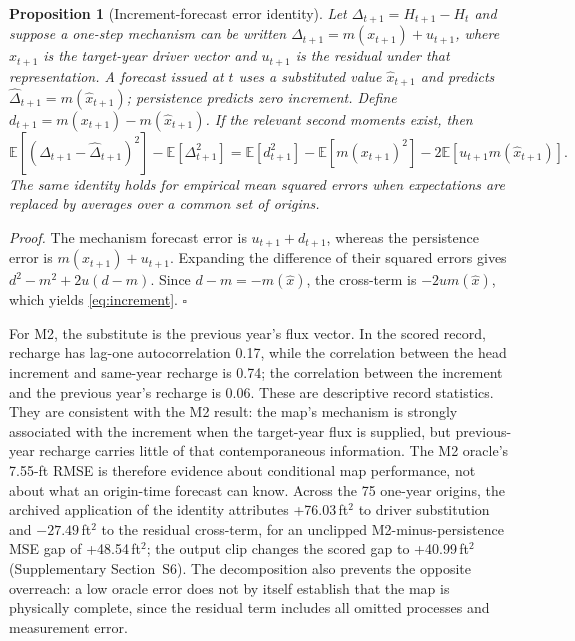 \documentclass[11pt]{article}
\newtheorem{proposition}{Proposition}
\begin{document}
\begin{proposition}[Increment-forecast error identity]\label{prop:increment}
Let \(\Delta_{t+1}=H_{t+1}-H_t\) and suppose a one-step mechanism can be written \(\Delta_{t+1}=m(x_{t+1})+u_{t+1}\), where \(x_{t+1}\) is the target-year driver vector and \(u_{t+1}\) is the residual under that representation. A forecast issued at \(t\) uses a substituted value \(\widehat x_{t+1}\) and predicts \(\widehat\Delta_{t+1}=m(\widehat x_{t+1})\); persistence predicts zero increment. Define \(d_{t+1}=m(x_{t+1})-m(\widehat x_{t+1})\). If the relevant second moments exist, then
\begin{equation}\label{eq:increment}
\mathbb{E}\left[(\Delta_{t+1}-\widehat\Delta_{t+1})^2\right]-\mathbb{E}\left[\Delta_{t+1}^2\right]
=\mathbb{E}[d_{t+1}^2]-\mathbb{E}[m(x_{t+1})^2]-2\mathbb{E}\left[u_{t+1}m(\widehat x_{t+1})\right].
\end{equation}
The same identity holds for empirical mean squared errors when expectations are replaced by averages over a common set of origins.
\end{proposition}

\emph{Proof.} The mechanism forecast error is \(u_{t+1}+d_{t+1}\), whereas the persistence error is \(m(x_{t+1})+u_{t+1}\). Expanding the difference of their squared errors gives \(d^2-m^2+2u(d-m)\). Since \(d-m=-m(\widehat x)\), the cross-term is \(-2u m(\widehat x)\), which yields \eqref{eq:increment}. \(\square\)

For M2, the substitute is the previous year's flux vector. In the scored record, recharge has lag-one autocorrelation 0.17, while the correlation between the head increment and same-year recharge is 0.74; the correlation between the increment and the previous year's recharge is 0.06. These are descriptive record statistics. They are consistent with the M2 result: the map's mechanism is strongly associated with the increment when the target-year flux is supplied, but previous-year recharge carries little of that contemporaneous information. The M2 oracle's 7.55-ft RMSE is therefore evidence about conditional map performance, not about what an origin-time forecast can know. Across the 75 one-year origins, the archived application of the identity attributes +76.03\,ft$^2$ to driver substitution and $-27.49$\,ft$^2$ to the residual cross-term, for an unclipped M2-minus-persistence MSE gap of +48.54\,ft$^2$; the output clip changes the scored gap to +40.99\,ft$^2$ (Supplementary Section~S6). The decomposition also prevents the opposite overreach: a low oracle error does not by itself establish that the map is physically complete, since the residual term includes all omitted processes and measurement error.
\end{document}
